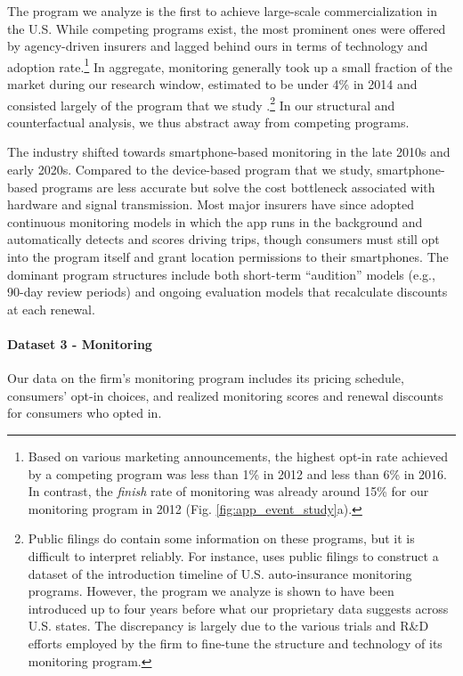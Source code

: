 The program we analyze is the first to achieve large-scale commercialization in the U.S. While competing programs exist, the most prominent ones were offered by agency-driven insurers and lagged behind ours in terms of technology and adoption rate.\footnote{Based on various marketing announcements, the highest opt-in rate achieved by a competing program was less than 1\% in 2012 and less than 6\% in 2016. In contrast, the \textit{finish} rate of monitoring was already around 15\% for our monitoring program in 2012 (Fig. \ref{fig:app_event_study}a).} In aggregate, monitoring generally took up a small fraction of the market during our research window, estimated to be under 4\% in 2014 and consisted largely of the program that we study \parencite{ptolemus2016}.\footnote{Public filings do contain some information on these programs, but it is difficult to interpret reliably. For instance, \textcite{reimers2019impacts} uses public filings to construct a dataset of the introduction timeline of U.S. auto-insurance monitoring programs. However, the program we analyze is shown to have been introduced up to four years before what our proprietary data suggests across U.S. states.
The discrepancy is largely due to the various trials and R\&D efforts employed by the firm to fine-tune the structure and technology of its monitoring program.}
In our structural and counterfactual analysis, we thus abstract away from competing programs.

The industry shifted towards smartphone-based monitoring in the late 2010s and early 2020s. Compared to the device-based program that we study, smartphone-based programs are less accurate but solve the cost bottleneck associated with hardware and signal transmission. Most major insurers have since adopted continuous monitoring models in which the app runs in the background and automatically detects and scores driving trips, though consumers must still opt into the program itself and grant location permissions to their smartphones. The dominant program structures include both short-term ``audition'' models (e.g., 90-day review periods) and ongoing evaluation models that recalculate discounts at each renewal.

\paragraph{Dataset 3 - Monitoring}
Our data on the firm's monitoring program includes its pricing schedule, consumers' opt-in choices, and realized monitoring scores and renewal discounts for consumers who opted in.

